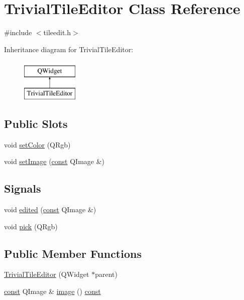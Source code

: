 \hypertarget{classTrivialTileEditor}{\section{Trivial\+Tile\+Editor Class Reference}
\label{classTrivialTileEditor}
}


{\ttfamily \#include $<$tileedit.\+h$>$}

Inheritance diagram for Trivial\+Tile\+Editor\+:\begin{figure}[H]
\begin{center}
\leavevmode
\includegraphics[height=2.000000cm]{classTrivialTileEditor}
\end{center}
\end{figure}
\subsection*{Public Slots}
\begin{DoxyCompactItemize}
\item 
void \hyperlink{classTrivialTileEditor_a6c09858062dd3938306f2585fff64468}{set\+Color} (Q\+Rgb)
\item 
void \hyperlink{classTrivialTileEditor_afd85687509e7d91ac4431645840fc84e}{set\+Image} (\hyperlink{tradstdc_8h_a2c212835823e3c54a8ab6d95c652660e}{const} Q\+Image \&)
\end{DoxyCompactItemize}
\subsection*{Signals}
\begin{DoxyCompactItemize}
\item 
void \hyperlink{classTrivialTileEditor_a2df5db5124e00b371951c3e43e76d1d2}{edited} (\hyperlink{tradstdc_8h_a2c212835823e3c54a8ab6d95c652660e}{const} Q\+Image \&)
\item 
void \hyperlink{classTrivialTileEditor_ae610f63d44364a9e6623482adab14149}{pick} (Q\+Rgb)
\end{DoxyCompactItemize}
\subsection*{Public Member Functions}
\begin{DoxyCompactItemize}
\item 
\hyperlink{classTrivialTileEditor_aae376e485da4416d113a224cbec073fd}{Trivial\+Tile\+Editor} (Q\+Widget $\ast$parent)
\item 
\hyperlink{tradstdc_8h_a2c212835823e3c54a8ab6d95c652660e}{const} Q\+Image \& \hyperlink{classTrivialTileEditor_a2ff2c7e5f93eb8231a1de15e837d21c2}{image} () \hyperlink{tradstdc_8h_a2c212835823e3c54a8ab6d95c652660e}{const} 
\end{DoxyCompactItemize}
